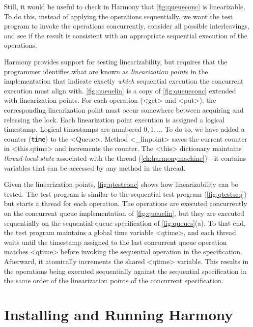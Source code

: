 \documentclass{report}
\begin{document}
Still, it would be useful to check in Harmony that
\autoref{fig:queueconc} is linearizable.
To do this, instead of applying the operations sequentially,
we want the test program to invoke the operations concurrently,
consider all possible interleavings, and see if the result
is consistent with an appropriate sequential execution of the
operations.

%
Harmony provides support for testing linearizability,
but requires that the programmer
identifies what are known as \emph{linearization points}
in the implementation that indicate exactly \emph{which} sequential
execution the concurrent execution must align with.
\autoref{fig:queuelin} is a copy of \autoref{fig:queueconc} extended with
linearization points.
For each operation (<{get}> and <{put}>), the corresponding
linearization point must occur somewhere between acquiring and releasing
the lock.
%
Each linearization point execution is assigned a logical timestamp.
Logical timestamps are numbered $0, 1, ...$
To do so, we have added a counter (\texttt{time}) to the <{Queue}>.
Method <{_linpoint}> saves the current counter in
<{this.qtime}> and increments the counter.
The <{this}> dictionary maintains \emph{thread-local state} associated
with the thread (\autoref{ch:harmonymachine})---it contains variables that
can be accessed by any method in the thread.

Given the linearization points, \autoref{fig:qtestconc} shows how
linearizability can be tested.
The test program is similar to the sequential test program
(\autoref{fig:qtestseq}) but starts a thread for each operation.
The operations are executed concurrently on the concurrent queue
implementation of \autoref{fig:queuelin}, but they are executed sequentially
on the sequential queue specification of \autoref{fig:queues}(a).
To that end, the test program maintains a global time variable
<{qtime}>, and each thread waits until the timestamp assigned to
the last concurrent queue operation matches <{qtime}> before invoking
the sequential operation in the specification.
Afterward, it atomically increments the shared <{qtime}> variable.
This results in the operations being executed sequentially against the
sequential specification in the same order of the linearization points
of the concurrent specification.

\chapter{Installing and Running Harmony}\label{app:install}
\end{document}

